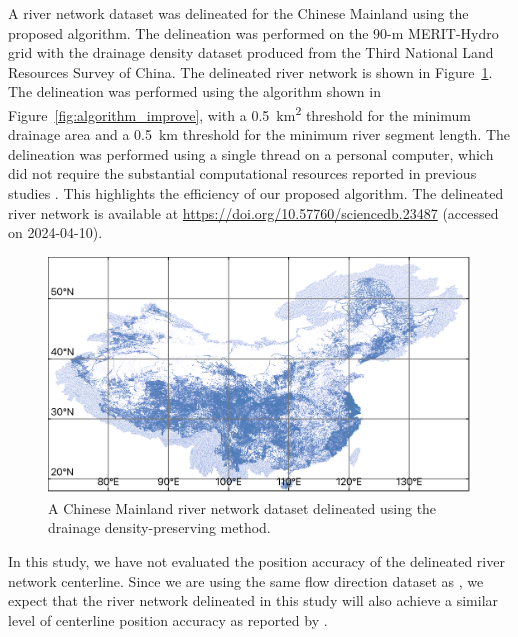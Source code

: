 \documentclass[water,article,submit,pdftex,moreauthors]{Definitions/mdpi}
\begin{document}
A river network dataset was delineated for the Chinese Mainland using the proposed algorithm. The delineation was performed on the 90-m MERIT-Hydro grid with the drainage density dataset produced from the Third National Land Resources Survey of China. The delineated river network is shown in Figure~\ref{fig:china}. The delineation was performed using the algorithm shown in Figure~\ref{fig:algorithm_improve}, with a 0.5~km\textsuperscript{2} threshold for the minimum drainage area and a 0.5~km threshold for the minimum river segment length. The delineation was performed using a single thread on a personal computer, which did not require the substantial computational resources reported in previous studies \citep{lin2021SD}. This highlights the efficiency of our proposed algorithm. The delineated river network is available at \url{https://doi.org/10.57760/sciencedb.23487} (accessed on 2024-04-10).

\begin{figure}[H]
  \includegraphics[width=\textwidth]{china.png}
  \caption{A Chinese Mainland river network dataset delineated using the drainage density-preserving method.\label{fig:china}}
\end{figure}

In this study, we have not evaluated the position accuracy of the delineated river network centerline. Since we are using the same flow direction dataset as \citet{lin2021SD}, we expect that the river network delineated in this study will also achieve a similar level of centerline position accuracy as reported by \citet{lin2021SD}.
\end{document}
